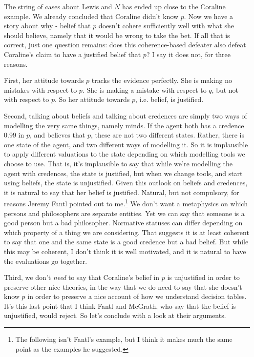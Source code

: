 The string of cases about Lewis and $N$ has ended up close to the Coraline example. We already concluded that Coraline didn't know $p$. Now we have a story about why - belief that $p$ doesn't cohere sufficiently well with what she should believe, namely that it would be wrong to take the bet. If all that is correct, just one question remains: does this coherence-based defeater also defeat Coraline's claim to have a justified belief that $p$? I say it does not, for three reasons.

First, her attitude towards $p$ tracks the evidence perfectly. She is making no mistakes with respect to $p$. She is making a mistake with respect to $q$, but not with respect to $p$. So her attitude towards $p$, i.e. belief, is justified.

Second, talking about beliefs and talking about credences are simply two ways of modelling the very same things, namely minds. If the agent both has a credence 0.99 in $p$, and believes that $p$, these are not two different states. Rather, there is one state of the agent, and two different ways of modelling it. So it is implausible to apply different valuations to the state depending on which modelling tools we choose to use. That is, it's implausible to say that while we're modelling the agent with credences, the state is justified, but when we change tools, and start using beliefs, the state is unjustified. Given this outlook on beliefs and credences, it is natural to say that her belief is justified. Natural, but not compulsory, for reasons Jeremy Fantl pointed out to me.\footnote{The following isn't Fantl's example, but I think it makes much the same point as the examples he suggested.} We don't want a metaphysics on which persons and philosophers are separate entities. Yet we can say that someone is a good person but a bad philosopher. Normative statuses can differ depending on which property of a thing we are considering. That suggests it is at least coherent to say that one and the same state is a good credence but a bad belief. But while this may be coherent, I don't think it is well motivated, and it is natural to have the evaluations go together.

Third, we don't \textit{need} to say that Coraline's belief in $p$ is unjustified in order to preserve other nice theories, in the way that we do need to say that she doesn't know $p$ in order to preserve a nice account of how we understand decision tables. It's this last point that I think Fantl and McGrath, who say that the belief is unjustified, would reject. So let's conclude with a look at their arguments.

